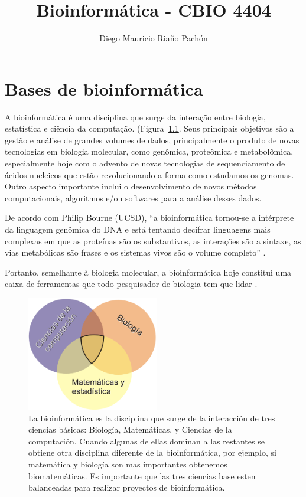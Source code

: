 \documentclass[letter,11pt]{book}
\author{Diego Mauricio Ria\~{n}o Pach\'{o}n}
\title{Bioinformática - CBIO 4404}
\begin{document}
\maketitle
\tableofcontents
\listoffigures

\chapter{Bases de bioinformática}


A bioinformática é uma disciplina que surge da interação entre biologia, estatística e ciência da computação. (Figura~\ref{bioinf}. Seus principais objetivos são a gestão e análise de grandes volumes de dados, principalmente o produto de novas tecnologias em biologia molecular, como genômica, proteômica e metabolômica, especialmente hoje com o advento de novas tecnologias de sequenciamento de ácidos nucleicos que estão revolucionando a forma como estudamos os genomas. Outro aspecto importante inclui o desenvolvimento de novos métodos computacionais, algoritmos e/ou softwares para a análise desses dados. 

De acordo com Philip Bourne (UCSD), ``a bioinformática tornou-se a intérprete da linguagem genômica do DNA e está tentando decifrar linguagens mais complexas em que as proteínas são os substantivos, as interações são a sintaxe, as vias metabólicas são frases e os sistemas vivos são o volume completo'' \citep{Bourne2004}.

Portanto, semelhante à biologia molecular, a bioinformática hoje constitui uma caixa de ferramentas que todo pesquisador de biologia tem que lidar \citetext{\citealp{Stein2008} apresenta um ponto de vista muito interessante}.

\begin{figure}[h]
\centering
   \includegraphics[height=5cm]{Figs/Bioinformatica.png}
  \caption[{\textquestiondown}Que es la bioinformática?]{\label{bioinf}La bioinformática es la disciplina que surge de la interacción de tres ciencias básicas: Biología, Matemáticas, y Ciencias de la computación. Cuando algunas de ellas dominan a las restantes se obtiene otra disciplina diferente de la bioinformática, por ejemplo, si matemática y biología son mas importantes obtenemos biomatemáticas. Es importante que las tres ciencias base esten balanceadas para realizar proyectos de bioinformática.}
\end{figure}
\end{document}
